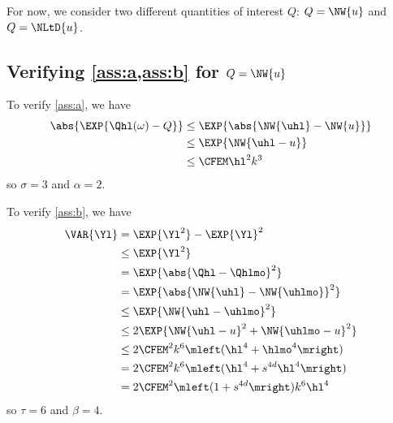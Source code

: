 

For now, we consider two different quantities of interest $Q$: $Q = \NW{u} $ and $Q = \NLtD{u}$.%

\subsection{Verifying \cref{ass:a,ass:b} for $Q = \NW{u}$}\label{sec:abweight}
To verify \cref{ass:a}, we have
\begin{align*}
\abs{\EXP{\Qhl(\omega) - Q}} &\leq \EXP{\abs{\NW{\uhl} - \NW{u}}}\\
&\leq \EXP{\NW{\uhl - u}}\\
&\leq \CFEM \hl^2 k^3
\end{align*}
so $\sigma = 3$ and $\alpha=2.$

To verify \cref{ass:b}, we have 
\begin{align*}
\VAR{\Yl} &= \EXP{\Yl^2} - \EXP{\Yl}^2\\
&\leq \EXP{\Yl^2}\\
&= \EXP{\abs{\Qhl-\Qhlmo}^2}\\
&= \EXP{\abs{\NW{\uhl}-\NW{\uhlmo}}^2}\\
&\leq \EXP{\NW{\uhl-\uhlmo}^2}\\
&\leq 2\EXP{\NW{\uhl-u}^2 + \NW{\uhlmo-u}^2}\\
&\leq 2\CFEM^2 k^6 \mleft(\hl^4 + \hlmo^4\mright)\\
&= 2\CFEM^2 k^6 \mleft(\hl^4 + s^{4d}\hl^4\mright)\\
&= 2\CFEM^2\mleft(1+s^{4d}\mright) k^6 \hl^4
\end{align*}
so $\tau = 6$ and $\beta = 4.$

